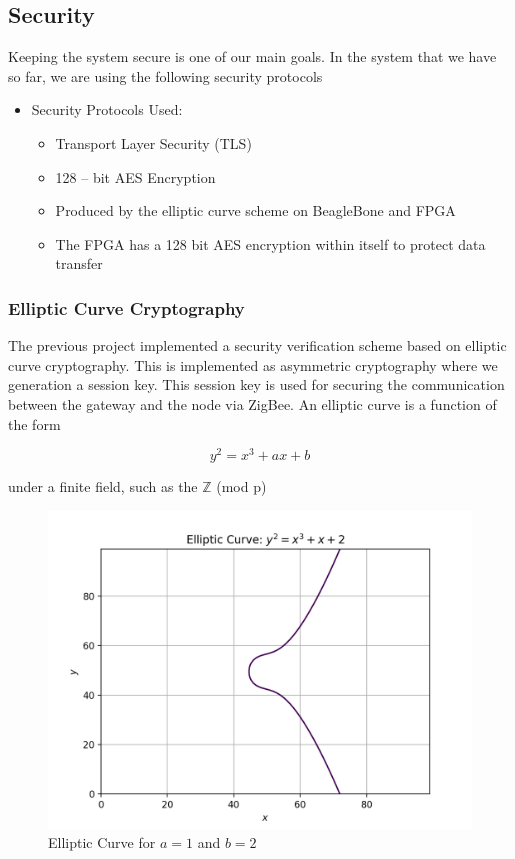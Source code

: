 \documentclass[11pt]{article}
\begin{document}
\subsection{Security}


Keeping the system secure is one of our main goals. In the system that we have so far, we are using the following security protocols
\begin{itemize}
    \item Security Protocols Used: 
    
    \begin{itemize}
       \item  Transport Layer Security (TLS) 
        \item 128 – bit AES Encryption 
        \item Produced by the elliptic curve scheme on BeagleBone and FPGA 
        \item The FPGA has a 128 bit AES encryption within itself to protect data transfer 
    \end{itemize}
\end{itemize}


\subsubsection{Elliptic Curve Cryptography}

The previous project implemented a security verification scheme based on elliptic curve cryptography. This is implemented as asymmetric cryptography where we generation a session key. This session key is used for securing the communication between the gateway and the node via ZigBee. An elliptic curve is a function of the form 

\[y^2 = x^3 + ax + b \]

under a finite field, such as the $\mathbb{Z}$ (mod p)

\begin{figure}[!ht]
\centering
\includegraphics[scale = 0.35]{ecurve.png}
\caption{Elliptic Curve for $a = 1$ and $b = 2$}
\end{figure}
\end{document}
